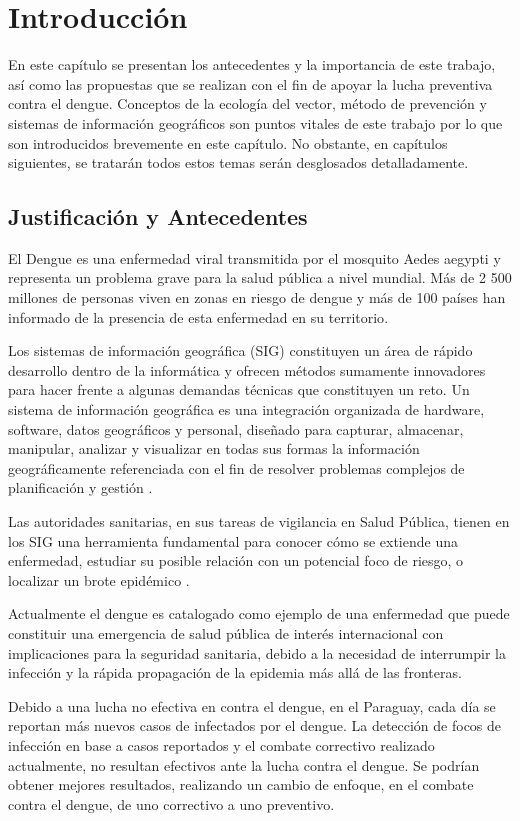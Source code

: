 \chapter{Introducción}
En este capítulo se presentan los antecedentes y la importancia de este trabajo, así como las
propuestas que se realizan con el fin de apoyar la lucha preventiva contra el dengue. Conceptos de
la ecología del vector, método de prevención y sistemas de información geográficos son puntos
vitales de este trabajo por lo que son introducidos brevemente en este capítulo. No obstante, en
capítulos siguientes, se tratarán todos estos temas serán desglosados detalladamente.

\section{Justificación y Antecedentes}

El Dengue es una enfermedad viral transmitida por el mosquito Aedes aegypti y representa un
problema grave para la salud pública a nivel mundial. Más de 2 500 millones de personas viven en
zonas en riesgo de dengue y más de 100 países han informado de la presencia de esta enfermedad en
su territorio\citep{gustavo2006dengue}.

Los sistemas de información geográfica (SIG) constituyen un área de rápido desarrollo dentro
de la informática y ofrecen métodos sumamente innovadores para hacer frente a algunas demandas
técnicas que constituyen un reto. Un sistema de información geográfica es una integración
organizada de hardware, software, datos geográficos y personal, diseñado para capturar, almacenar,
manipular, analizar y visualizar en todas sus formas la información geográficamente referenciada
con el fin de resolver problemas complejos de planificación y gestión \citep{lopezMarcos2007}.

Las autoridades sanitarias, en sus tareas de vigilancia en Salud Pública, tienen en los SIG una
herramienta fundamental para conocer cómo se extiende una enfermedad, estudiar su posible relación
con un potencial foco de riesgo, o localizar un brote epidémico \citep{vgomesAegis2001}.

Actualmente el dengue es catalogado como ejemplo de una enfermedad que puede constituir una
emergencia de salud pública de interés internacional con implicaciones para la seguridad
sanitaria, debido a la necesidad de interrumpir la infección y la rápida propagación de la
epidemia más allá de las fronteras.

Debido a una lucha no efectiva en contra el dengue, en  el Paraguay, cada día se reportan más
nuevos casos de infectados por el dengue. La detección de focos de infección en base a casos
reportados y el combate correctivo realizado actualmente, no resultan efectivos ante la lucha
contra el dengue. Se podrían obtener mejores resultados, realizando un cambio de enfoque, en el combate contra el dengue, de uno correctivo a uno preventivo.

